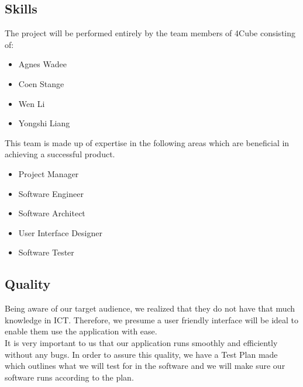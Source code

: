 \documentclass[a4paper,11pt]{article}
\begin{document}
      	\subsection{Skills}
      	  The project will be performed entirely by the team members of 4Cube consisting of:
      	 \begin{itemize}
      	 	 \item Agnes Wadee
      	 	 \item Coen Stange
      	 	 \item Wen Li
      	 	 \item Yongshi Liang
      	   
      	 \end{itemize}
      	 This team is made up of expertise in the following areas which are beneficial in achieving a successful product.
      	 \begin{itemize}
      	 	\item Project Manager
      	 	\item Software Engineer
      	 	\item Software Architect 
      	 	\item User Interface Designer
      	 	\item Software Tester
      	 	
      	 
      	 \end{itemize} 
      	
      	\subsection{Quality}
      	Being aware of our target audience, we realized that they do not have that much knowledge in ICT. Therefore, we presume a user friendly interface will be ideal to enable them use the application with ease. \\ It is very important to us that our application runs smoothly and efficiently without any bugs. In order to assure this quality, we have a Test Plan made which outlines what we will test for in the software and we will make sure our software runs according to the plan. 
      	
\end{document}
